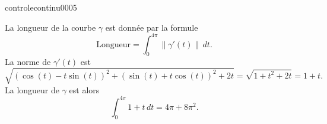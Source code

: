 \begin{corrige}{controlecontinu0005}
  
La longueur de la courbe $\gamma$ est donnée par la formule 
\begin{equation}
  \textrm{Longueur} = \int_{0}^{4\pi}\|\gamma'(t)\|\,dt.
\end{equation}
La norme de $\gamma'(t)$ est 
\[
\sqrt{(\cos(t)-t\sin(t))^2+ (\sin(t)+t\cos(t))^2+ 2t}=\sqrt{1+t^2+2t}= 1+t.
\]
La longueur de $\gamma$ est alors 
\[
\int_{0}^{4\pi} 1+t\,dt=4\pi+8\pi^2.
\]

\end{corrige}
